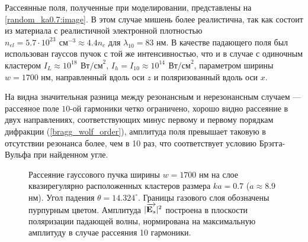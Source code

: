
Рассеянные поля, полученные при моделировании, представлены на \autoref{random_ka0.7:image}. В этом случае мишень более реалистична, так как состоит из материала с реалистичной электронной плотностью $n_{el} = 5.7 \cdot 10^{23}\:\,\textrm{см}^{-3} \approx 4.4 n_{c}$ для $\lambda_{10} = 83$ нм. В качестве падающего поля был использован гауссов пучок с той же интенсивностью, что и в случае с одиночным кластером $I_{L} \approx 10^{18}\:\,\textrm{Вт/см}^2$, $I_h = I_{10} \approx 10^{14}\:\,\textrm{Вт/см}^2$, параметром ширины $w = 1700$ нм, направленный вдоль оси $z$ и поляризованный вдоль оси $x$.

На  видна значительная разница между резонансным и нерезонансным случаем --- рассеяное поле $10$-ой гармоники четко ограничено, хорошо видно рассеяние в двух направлениях, соответствующих минус первому и первому порядкам дифракции (\autoref{bragg_wolf_order}), амплитуда поля превышает таковую в отсутствии резонанса более, чем в 10 раз, что соответствует условию Брэгга-Вульфа при найденном угле.

    \begin{figure}[ht]
        \hfil
        \caption{Рассеяние гауссового пучка ширины $w = 1700$ нм на слое квазирегулярно расположенных кластеров размера $ka = 0.7$ ($a \approx 8.9$ нм). Угол падения $\theta = 14.324^{\circ}$. Границы газового слоя обозначены пурпурным цветом. Амплитуда $|\overrightarrow{\textbf{E}_{s}}|^2$ построена в плоскости поляризации падающей волны, нормирована на максимальную амплитуду в случае рассеяния 10 гармоники.}\label{random_ka0.7:image}
    \end{figure}

